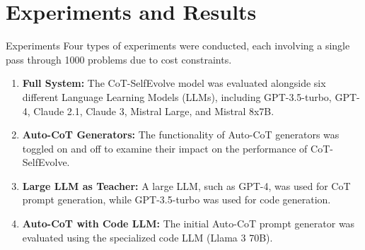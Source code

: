 \section{Experiments and Results}

\begin{frame}{Experiments}
    Four types of experiments were conducted, each involving a single pass through 1000 problems due to cost constraints.

    \begin{enumerate}
        \item \textbf{Full System:} The CoT-SelfEvolve model was evaluated alongside six different Language Learning Models (LLMs), including GPT-3.5-turbo, GPT-4, Claude 2.1, Claude 3, Mistral Large, and Mistral 8x7B.

        \item \textbf{Auto-CoT Generators:} The functionality of Auto-CoT generators was toggled on and off to examine their impact on the performance of CoT-SelfEvolve.

        \item \textbf{Large LLM as Teacher:} A large LLM, such as GPT-4, was used for CoT prompt generation, while GPT-3.5-turbo was used for code generation.

        \item \textbf{Auto-CoT with Code LLM:} The initial Auto-CoT prompt generator was evaluated using the specialized code LLM (Llama 3 70B).
    \end{enumerate}
\end{frame}

